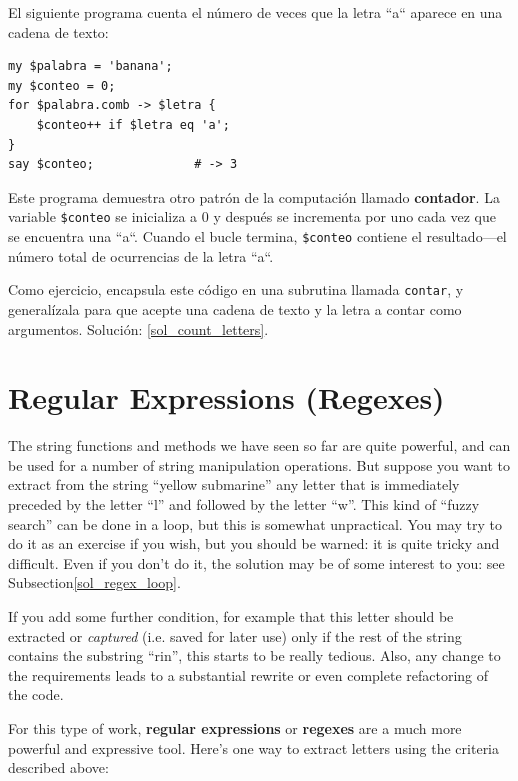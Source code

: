 El siguiente programa cuenta el número de veces que 
la letra ``a`` aparece en una cadena de texto:

\begin{verbatim}
my $palabra = 'banana';
my $conteo = 0;
for $palabra.comb -> $letra {
    $conteo++ if $letra eq 'a';
}
say $conteo;              # -> 3
\end{verbatim}
%

Este programa demuestra otro patrón de la computación 
llamado {\bf contador}. La variable \verb|$conteo| se inicializa
a 0 y después se incrementa por uno cada vez que se encuentra
una ``a``. Cuando el bucle termina, \verb|$conteo| contiene
el resultado---el número total de ocurrencias de la letra ``a``.

Como ejercicio, encapsula este código en una subrutina llamada
{\tt contar}, y generalízala para que acepte una cadena de texto 
y la letra a contar como argumentos. Solución: \ref{sol_count_letters}.
\label{count_letters}

\section{Regular Expressions (Regexes)}
\label{regex}

The string functions and methods we have seen so far are 
quite powerful, and can be used for a number of string 
manipulation operations. But suppose you want to extract 
from the string ``yellow submarine'' any letter that is 
immediately preceded by the letter ``l'' and followed by 
the letter ``w''. This kind of ``fuzzy search'' 
can be done in a loop, but this is 
somewhat unpractical. You may try to do it as an exercise if 
you wish, but you should be warned: it is quite tricky and 
difficult. Even if you don't do it, the solution may be of some 
interest to you: see Subsection\ref{sol_regex_loop}. 
\label{regex_loop}


If you add some further condition, 
for example that this letter should be extracted or 
\emph{captured} (i.e. saved for later use) only if 
the rest of the string contains the substring ``rin'', 
this starts to be really tedious. Also, any change to the 
requirements leads to a substantial rewrite or even 
complete refactoring of the code.

For this type of work, {\bf regular expressions} or 
{\bf regexes}  are a much more powerful and expressive tool. 
Here's one way to extract letters using the criteria 
described above:

